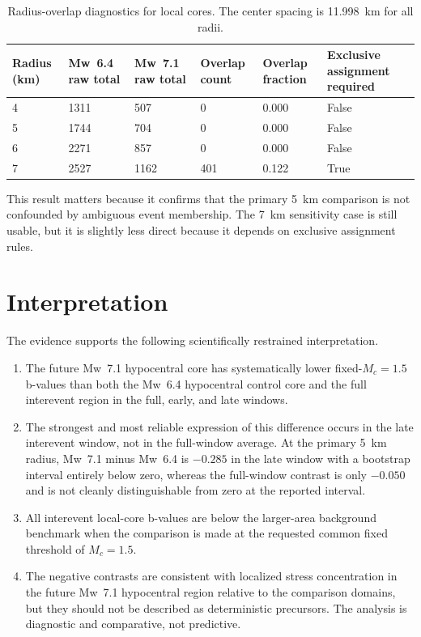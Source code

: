 \documentclass[11pt]{article}
\begin{document}
\begin{table}[H]
\centering
\caption{Radius-overlap diagnostics for local cores. The center spacing is 11.998~km for all radii.}
\label{tab:overlap}
\small
\begin{tabular}{p{1.5cm}p{2.2cm}p{2.2cm}p{1.8cm}p{2.0cm}p{3.2cm}}
\toprule
Radius (km) & Mw~6.4 raw total & Mw~7.1 raw total & Overlap count & Overlap fraction & Exclusive assignment required \\
\midrule
4 & 1311 & 507 & 0 & 0.000 & False \\
5 & 1744 & 704 & 0 & 0.000 & False \\
6 & 2271 & 857 & 0 & 0.000 & False \\
7 & 2527 & 1162 & 401 & 0.122 & True \\
\bottomrule
\end{tabular}
\normalsize
\end{table}

This result matters because it confirms that the primary 5~km comparison is not confounded by ambiguous event membership. The 7~km sensitivity case is still usable, but it is slightly less direct because it depends on exclusive assignment rules.

\section{Interpretation}
The evidence supports the following scientifically restrained interpretation.

\begin{enumerate}
    \item The future Mw~7.1 hypocentral core has systematically lower fixed-$M_c=1.5$ b-values than both the Mw~6.4 hypocentral control core and the full interevent region in the full, early, and late windows.
    \item The strongest and most reliable expression of this difference occurs in the late interevent window, not in the full-window average. At the primary 5~km radius, Mw~7.1 minus Mw~6.4 is $-0.285$ in the late window with a bootstrap interval entirely below zero, whereas the full-window contrast is only $-0.050$ and is not cleanly distinguishable from zero at the reported interval.
    \item All interevent local-core b-values are below the larger-area background benchmark when the comparison is made at the requested common fixed threshold of $M_c=1.5$.
    \item The negative contrasts are consistent with localized stress concentration in the future Mw~7.1 hypocentral region relative to the comparison domains, but they should not be described as deterministic precursors. The analysis is diagnostic and comparative, not predictive.
\end{enumerate}
\end{document}
